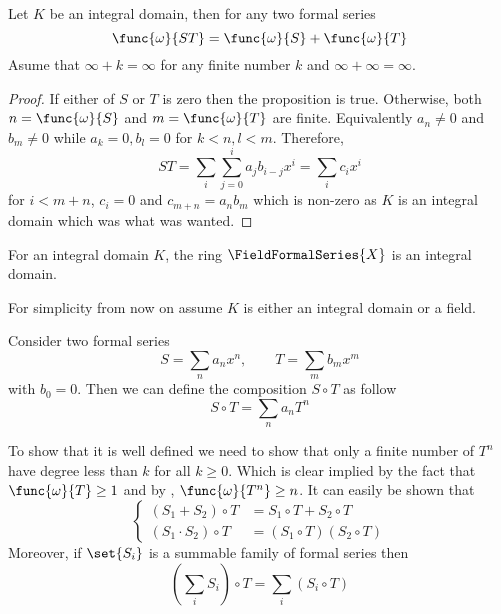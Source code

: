 \begin{proposition} \label{th:orderOfMultiplication}
    Let \(K\) be an integral domain, then for any two formal series 
    \begin{equation*}
        \func{\omega}{ST} = \func{\omega}{S} + \func{\omega}{T} 
    \end{equation*}
    Asume that \(\infty + k = \infty\) for any finite number \(k\) and \(\infty + \infty = \infty\).
\end{proposition}

\begin{proof}
    If either of \(S\) or \(T\) is zero then the proposition is true. Otherwise, both \(n = \func{\omega}{S}\) and \(m = \func{\omega}{T}\) are finite. Equivalently \(a_n \neq 0 \) and \(b_m \neq 0\) while \(a_k = 0, b_l = 0\) for \(k < n, l < m\). Therefore, 
    \begin{equation*}
        ST = \sum_i \sum_{j = 0}^i a_{j}b_{i - j} x^i = \sum_i c_i x^i
    \end{equation*}
    for \(i < m + n\), \(c_i = 0\) and \(c_{m+n} = a_nb_m\) which is non-zero as \(K\) is an integral domain which was what was wanted.
\end{proof}

\begin{corollary}
    For an integral domain \(K\), the ring \(\FieldFormalSeries{X}\) is an integral domain.
\end{corollary}
For simplicity from now on assume \(K\) is either an integral domain or a field.

Consider two formal series 
\begin{equation*}
    S = \sum_n a_nx^n , \qquad T = \sum_m b_m x^m
\end{equation*}
with \(b_0 = 0\). Then we can define the composition \(S \circ T\) as follow 
\begin{equation*}
    S \circ T = \sum_n a_n T^n
\end{equation*}

To show that it is well defined we need to show that only a finite number of \(T^n\) have degree less than \(k\) for all \(k \geq 0\). Which is clear implied by the fact that \(\func{\omega}{T} \geq 1\) and by , \(\func{\omega}{T^n} \geq n\). It can easily be shown that 
\begin{equation*}
    \begin{cases}
        (S_1 + S_2) \circ T &= S_1 \circ T + S_2 \circ T\\
        (S_1 \cdot S_2) \circ T &= (S_1 \circ T) (S_2 \circ T)
    \end{cases}
\end{equation*}
Moreover, if \(\set{S_i}\) is a summable family of formal series then 
\begin{equation*}
    (\sum_i S_i)\circ T = \sum_i (S_i \circ T)
\end{equation*}

